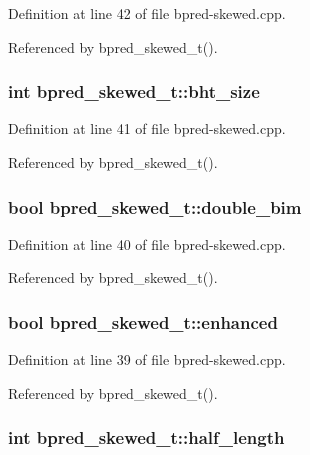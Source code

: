 Definition at line 42 of file bpred-skewed.cpp.

Referenced by bpred\_\-skewed\_\-t().
\subsubsection[{bht\_\-size}]{\setlength{\rightskip}{0pt plus 5cm}int {\bf bpred\_\-skewed\_\-t::bht\_\-size}\hspace{0.3cm}{\tt  [protected]}}\label{classbpred__skewed__t_9fba1cb25fe7975eed23a08aa19c1172}




Definition at line 41 of file bpred-skewed.cpp.

Referenced by bpred\_\-skewed\_\-t().
\subsubsection[{double\_\-bim}]{\setlength{\rightskip}{0pt plus 5cm}bool {\bf bpred\_\-skewed\_\-t::double\_\-bim}\hspace{0.3cm}{\tt  [protected]}}\label{classbpred__skewed__t_0e5406e1e018f591a20840dff0797275}




Definition at line 40 of file bpred-skewed.cpp.

Referenced by bpred\_\-skewed\_\-t().
\subsubsection[{enhanced}]{\setlength{\rightskip}{0pt plus 5cm}bool {\bf bpred\_\-skewed\_\-t::enhanced}\hspace{0.3cm}{\tt  [protected]}}\label{classbpred__skewed__t_e66c38ff78304143cab1033e711f74e5}




Definition at line 39 of file bpred-skewed.cpp.

Referenced by bpred\_\-skewed\_\-t().
\subsubsection[{half\_\-length}]{\setlength{\rightskip}{0pt plus 5cm}int {\bf bpred\_\-skewed\_\-t::half\_\-length}\hspace{0.3cm}{\tt  [protected]}}\label{classbpred__skewed__t_169999803db4523b18b189cedb83b04a}




